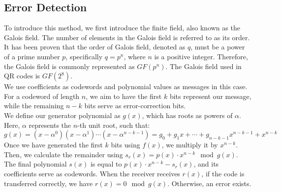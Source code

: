 \documentclass[12pt]{article}
\begin{document}
\subsection{Error Detection}
To introduce this method, we first introduce the finite field, also known as the Galois field\cite{edwards1984galois}. The number of elements in the Galois field is referred to as its order. It has been proven that the order of Galois field, denoted as $q$, must be a power of a prime number $p$, specifically $q = p^n$, where $n$ is a positive integer. Therefore, the Galois field is commonly represented as $GF(p^n)$. The Galois field used in QR codes is $GF(2^8)$.\\
We use coefficients as codewords and polynomial values as messages in this case. For a codeword of length $n$, we aim to have the first $k$ bits represent our message, while the remaining $n-k$ bits serve as error-correction bits.\\
We define our generator polynomial as $g(x)$, which has roots as powers of $\alpha$. Here, $\alpha$ represents the $n$-th unit root, such that: $${  g(x)=\left(x-\alpha^{0}\right)\left(x-\alpha ^{1}\right)\cdots \left(x-\alpha ^{n-k-1}\right)=g_{0}+g_{1}x+\cdots +g_{n-k-1}x^{n-k-1}+x^{n-k}}$$
Once we have generated the first $k$ bits using $f(x)$, we multiply it by $x^{n-k}$. Then, we calculate the remainder using ${  s_{r}(x) = p(x) \cdot x^{n-k} \mod g(x)}$. The final polynomial $s(x)$ is equal to $p(x) \cdot x^{n-k} - s_r(x)$, and its coefficients serve as codewords. When the receiver receives $r(x)$, if the code is transferred correctly, we have $r(x) = 0 \mod g(x)$. Otherwise, an error exists.
\end{document}
